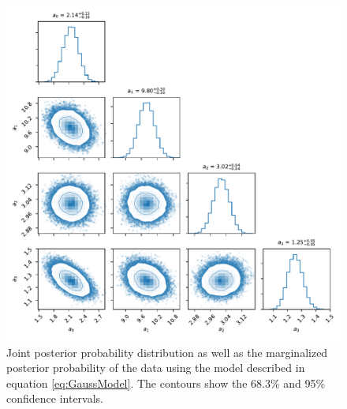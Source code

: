 \begin{figure}
    \centering
    \includegraphics{CodeAndFigures/GaussianModelMetropolisHastings.pdf}
    \caption{Joint posterior probability distribution as well as the marginalized posterior probability of the data using the model described in equation \ref{eq:GaussModel}. The contours show the 68.3\% and 95\% confidence intervals.}
    \label{fig:GaussHastings}
\end{figure}